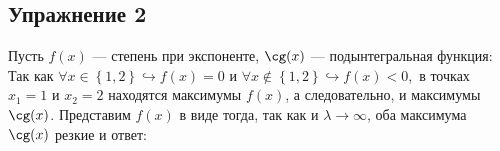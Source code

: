 \def \picdir{pic/}

\subsection*{Упражнение 2}
Пусть $f(x)$ --- степень при экспоненте, $\cg(x)$ --- подынтегральная функция:
Так как $\forall x \in \left\{1,2\right\} \hookrightarrow f(x) = 0$ и $\forall x \notin \left\{1,2\right\} \hookrightarrow f(x) < 0$,\
в точках $x_1 = 1$ и $x_2 = 2$ находятся максимумы $f(x)$, а следовательно, и максимумы
$\cg(x)$. Представим $f(x)$ в виде
тогда, так как
и $\lambda \rightarrow \infty$, оба максимума $\cg(x)$ резкие и
ответ:

